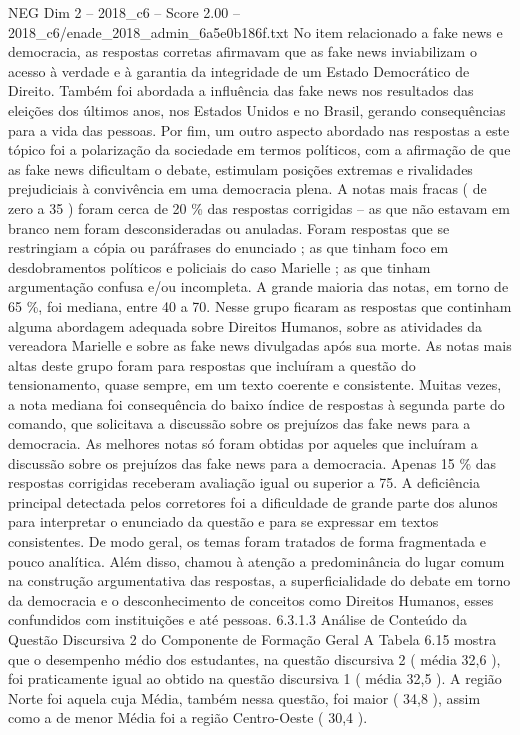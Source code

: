 \begin{textsample}{NEG Dim 2 – 2018\_c6 – Score 2.00 – 2018\_c6/enade\_2018\_admin\_6a5e0b186f.txt}
No item relacionado a fake news e democracia, as respostas corretas afirmavam que as fake news inviabilizam o acesso à verdade e à garantia da integridade de um Estado Democrático de Direito.
Também foi abordada a influência das fake news nos resultados das eleições dos últimos anos, nos Estados Unidos e no Brasil, gerando consequências para a vida das pessoas.
Por fim, um outro aspecto abordado nas respostas a este tópico foi a polarização da sociedade em termos políticos, com a afirmação de que as fake news dificultam o debate, estimulam posições extremas e rivalidades prejudiciais à convivência em uma democracia plena.
A notas mais fracas ( de zero a 35 ) foram cerca de 20 \% das respostas corrigidas – as que não estavam em branco nem foram desconsideradas ou anuladas.
Foram respostas que se restringiam a cópia ou paráfrases do enunciado ; as que tinham foco em desdobramentos políticos e policiais do caso Marielle ; as que tinham argumentação confusa e/ou incompleta.
A grande maioria das notas, em torno de 65 \%, foi mediana, entre 40 a 70.
Nesse grupo ficaram as respostas que continham alguma abordagem adequada sobre Direitos Humanos, sobre as atividades da vereadora Marielle e sobre as fake news divulgadas após sua morte.
As notas mais altas deste grupo foram para respostas que incluíram a questão do tensionamento, quase sempre, em um texto coerente e consistente.
Muitas vezes, a nota mediana foi consequência do baixo índice de respostas à segunda parte do comando, que solicitava a discussão sobre os prejuízos das fake news para a democracia.
As melhores notas só foram obtidas por aqueles que incluíram a discussão sobre os prejuízos das fake news para a democracia.
Apenas 15 \% das respostas corrigidas receberam avaliação igual ou superior a 75.
A deficiência principal detectada pelos corretores foi a dificuldade de grande parte dos alunos para interpretar o enunciado da questão e para se expressar em textos consistentes.
De modo geral, os temas foram tratados de forma fragmentada e pouco analítica.
Além disso, chamou à atenção a predominância do lugar comum na construção argumentativa das respostas, a superficialidade do debate em torno da democracia e o desconhecimento de conceitos como Direitos Humanos, esses confundidos com instituições e até pessoas. 6.3.1.3 Análise de Conteúdo da Questão Discursiva 2 do Componente de Formação Geral A Tabela 6.15 mostra que o desempenho médio dos estudantes, na questão discursiva 2 ( média 32,6 ), foi praticamente igual ao obtido na questão discursiva 1 ( média 32,5 ).
A região Norte foi aquela cuja Média, também nessa questão, foi maior ( 34,8 ), assim como a de menor Média foi a região Centro-Oeste ( 30,4 ).

\end{textsample}
